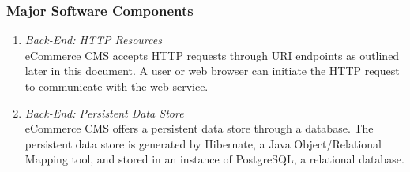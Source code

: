 \documentclass{article}
\newcommand{\br}{\vspace{2mm}}
\begin{document}

\subsubsection{Major Software Components}
\label{msc}

\begin{enumerate}
    \item[~\ref{msc}.1 ] \emph{Back-End: HTTP Resources}\br\\
        eCommerce CMS accepts HTTP requests through URI endpoints as outlined
        later in this document.  A user or web browser can initiate the HTTP
        request to communicate with the web service.
    \item[~\ref{msc}.2 ] \emph{Back-End: Persistent Data Store}\br\\
        eCommerce CMS offers a persistent data store through a database.  The
        persistent data store is generated by Hibernate, a Java Object/Relational
        Mapping tool, and stored in an instance of PostgreSQL, a relational
        database.


\end{enumerate}
\end{document}

